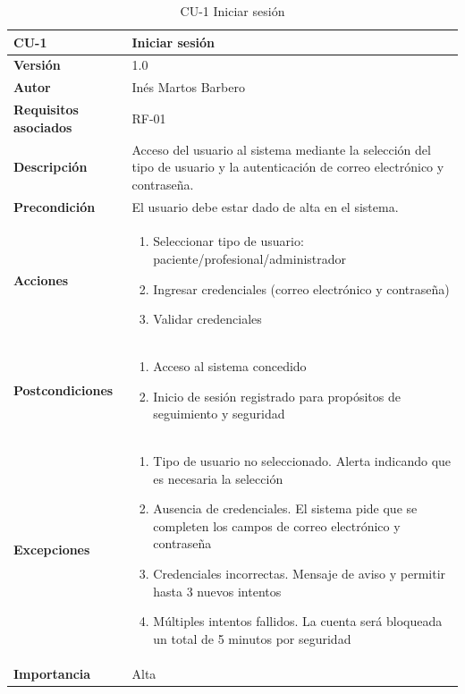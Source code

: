 \begin{table}[p]
	\centering
	\begin{tabularx}{\linewidth}{ p{} p{} }
		\toprule
		\textbf{CU-1}    & \textbf{Iniciar sesión}\\
		\toprule
        \textbf{Versión}              & 1.0    \\
		\textbf{Autor}                & Inés Martos Barbero \\
		\textbf{Requisitos asociados} & RF-01 \\
		\textbf{Descripción}          & Acceso del usuario al sistema mediante la selección del tipo de usuario y la autenticación de correo electrónico y contraseña. \\
		\textbf{Precondición}         & El usuario debe estar dado de alta en el sistema. \\
		\textbf{Acciones}             &
		\begin{enumerate}
			\def\labelenumi{\arabic{enumi}.}
			\tightlist
			\item Seleccionar tipo de usuario: paciente/profesional/administrador
			\item Ingresar credenciales (correo electrónico y contraseña)
            \item Validar credenciales
		\end{enumerate}\\
		\textbf{Postcondiciones}        & 
        \begin{enumerate}
			\def\labelenumi{\arabic{enumi}.}
			\tightlist
			\item Acceso al sistema concedido
			\item Inicio de sesión registrado para propósitos de seguimiento y seguridad
		\end{enumerate}\\
		\textbf{Excepciones}          & 
        \begin{enumerate}
			\def\labelenumi{\arabic{enumi}.}
			\tightlist
            \item Tipo de usuario no seleccionado. Alerta indicando que es necesaria la selección
            \item Ausencia de credenciales. El sistema pide que se completen los campos de correo electrónico y contraseña
			\item Credenciales incorrectas. Mensaje de aviso y permitir hasta 3 nuevos intentos
			\item Múltiples intentos fallidos. La cuenta será bloqueada un total de 5 minutos por seguridad
		\end{enumerate}\\
		\textbf{Importancia}          & Alta \\
		\bottomrule
	\end{tabularx}
	\caption{CU-1 Iniciar sesión}
    \label{CU-1}
\end{table}

